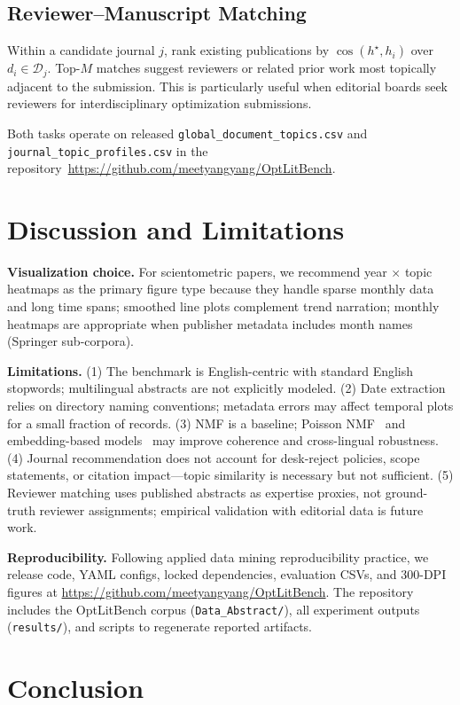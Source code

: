 \documentclass[conference]{IEEEtran}
\newcommand{\repo}{\url{https://github.com/meetyangyang/OptLitBench}}
\begin{document}
\subsection{Reviewer--Manuscript Matching}
Within a candidate journal $j$, rank existing publications by $\cos(h^\star, h_i)$ over $d_i\in\mathcal{D}_j$.
Top-$M$ matches suggest reviewers or related prior work most topically adjacent to the submission.
This is particularly useful when editorial boards seek reviewers for interdisciplinary optimization submissions.

Both tasks operate on released \texttt{global\_document\_topics.csv} and \texttt{journal\_topic\_profiles.csv} in the repository~\repo{}.

\section{Discussion and Limitations}
\label{sec:discussion}

\textbf{Visualization choice.} For scientometric papers, we recommend year $\times$ topic heatmaps as the primary figure type because they handle sparse monthly data and long time spans; smoothed line plots complement trend narration; monthly heatmaps are appropriate when publisher metadata includes month names (Springer sub-corpora).

\textbf{Limitations.}
(1) The benchmark is English-centric with standard English stopwords; multilingual abstracts are not explicitly modeled.
(2) Date extraction relies on directory naming conventions; metadata errors may affect temporal plots for a small fraction of records.
(3) NMF is a baseline; Poisson NMF~\cite{willis2021poisson} and embedding-based models~\cite{grootendorst2022bertopic} may improve coherence and cross-lingual robustness.
(4) Journal recommendation does not account for desk-reject policies, scope statements, or citation impact---topic similarity is necessary but not sufficient.
(5) Reviewer matching uses published abstracts as expertise proxies, not ground-truth reviewer assignments; empirical validation with editorial data is future work.

\textbf{Reproducibility.} Following applied data mining reproducibility practice, we release code, YAML configs, locked dependencies, evaluation CSVs, and 300-DPI figures at \repo{}.
The repository includes the OptLitBench corpus (\texttt{Data\_Abstract/}), all experiment outputs (\texttt{results/}), and scripts to regenerate reported artifacts.

\section{Conclusion}
\label{sec:conclusion}
\end{document}
